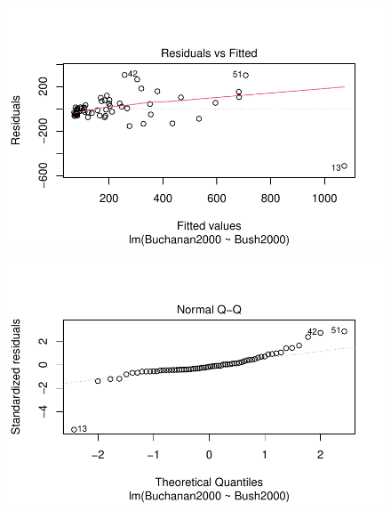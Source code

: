 \documentclass[
  letterpaper,
  DIV=11,
  numbers=noendperiod]{scrartcl}
\begin{document}
\begin{figure}[H]

{\centering \includegraphics{case_study_1_files/figure-pdf/unnamed-chunk-6-2.pdf}

}

\end{figure}

\begin{figure}[H]

{\centering \includegraphics{case_study_1_files/figure-pdf/unnamed-chunk-6-3.pdf}

}

\end{figure}
\end{document}

